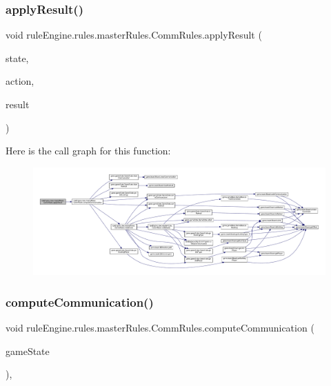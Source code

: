 \subsubsection{\texorpdfstring{apply\+Result()}{applyResult()}}
{\footnotesize\ttfamily void rule\+Engine.\+rules.\+master\+Rules.\+Comm\+Rules.\+apply\+Result (\begin{DoxyParamCaption}\item[{\mbox{\hyperlink{classgame_1_1game_state_1_1_game_state}{Game\+State}}}]{state,  }\item[{\mbox{\hyperlink{classrule_engine_1_1_game_action}{Game\+Action}}}]{action,  }\item[{\mbox{\hyperlink{classrule_engine_1_1_rule_result}{Rule\+Result}}}]{result }\end{DoxyParamCaption})\hspace{0.3cm}{\ttfamily [inline]}}

Here is the call graph for this function\+:
\nopagebreak
\begin{figure}[H]
\begin{center}
\leavevmode
\includegraphics[width=350pt]{classrule_engine_1_1rules_1_1master_rules_1_1_comm_rules_a57094df71e5c0d9d6e8dd10cf33d23c5_cgraph}
\end{center}
\end{figure}
\mbox{\label{classrule_engine_1_1rules_1_1master_rules_1_1_comm_rules_af8de9ef94d7ef2e2878534c7716490fc}} 
\subsubsection{\texorpdfstring{compute\+Communication()}{computeCommunication()}}
{\footnotesize\ttfamily void rule\+Engine.\+rules.\+master\+Rules.\+Comm\+Rules.\+compute\+Communication (\begin{DoxyParamCaption}\item[{\mbox{\hyperlink{classgame_1_1game_state_1_1_game_state}{Game\+State}}}]{game\+State }\end{DoxyParamCaption})\hspace{0.3cm}{\ttfamily [inline]}, {\ttfamily [private]}}

